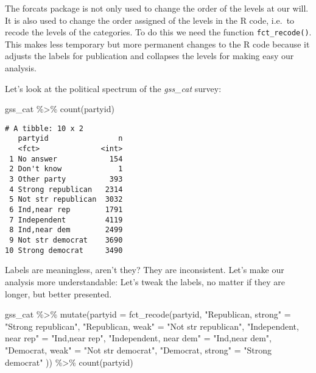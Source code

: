 \documentclass[
]{article}
\newenvironment{Shaded}{\begin{snugshade}}{\end{snugshade}}
\newcommand{\AttributeTok}[1]{\textcolor[rgb]{0.77,0.63,0.00}{#1}}
\newcommand{\FunctionTok}[1]{\textcolor[rgb]{0.00,0.00,0.00}{#1}}
\newcommand{\NormalTok}[1]{#1}
\newcommand{\OtherTok}[1]{\textcolor[rgb]{0.56,0.35,0.01}{#1}}
\newcommand{\SpecialCharTok}[1]{\textcolor[rgb]{0.00,0.00,0.00}{#1}}
\newcommand{\StringTok}[1]{\textcolor[rgb]{0.31,0.60,0.02}{#1}}
\begin{document}
The forcats package is not only used to change the order of the levels
at our will. It is also used to change the order assigned of the levels
in the R code, i.e.~to recode the levels of the categories. To do this
we need the function \texttt{fct\_recode()}. This makes less temporary
but more permanent changes to the R code because it adjusts the labels
for publication and collapses the levels for making easy our analysis.

Let's look at the political spectrum of the \emph{gss\_cat} survey:

\begin{Shaded}
\begin{Highlighting}[]
\NormalTok{gss\_cat }\SpecialCharTok{\%\textgreater{}\%} \FunctionTok{count}\NormalTok{(partyid)}
\end{Highlighting}
\end{Shaded}

\begin{verbatim}
# A tibble: 10 x 2
   partyid                n
   <fct>              <int>
 1 No answer            154
 2 Don't know             1
 3 Other party          393
 4 Strong republican   2314
 5 Not str republican  3032
 6 Ind,near rep        1791
 7 Independent         4119
 8 Ind,near dem        2499
 9 Not str democrat    3690
10 Strong democrat     3490
\end{verbatim}

Labels are meaningless, aren't they? They are inconsistent. Let's make
our analysis more understandable: Let's tweak the labels, no matter if
they are longer, but better presented.

\begin{Shaded}
\begin{Highlighting}[]
\NormalTok{gss\_cat }\SpecialCharTok{\%\textgreater{}\%}
  \FunctionTok{mutate}\NormalTok{(}\AttributeTok{partyid =} \FunctionTok{fct\_recode}\NormalTok{(partyid,}
    \StringTok{"Republican, strong"}    \OtherTok{=} \StringTok{"Strong republican"}\NormalTok{,}
    \StringTok{"Republican, weak"}      \OtherTok{=} \StringTok{"Not str republican"}\NormalTok{,}
    \StringTok{"Independent, near rep"} \OtherTok{=} \StringTok{"Ind,near rep"}\NormalTok{,}
    \StringTok{"Independent, near dem"} \OtherTok{=} \StringTok{"Ind,near dem"}\NormalTok{,}
    \StringTok{"Democrat, weak"}        \OtherTok{=} \StringTok{"Not str democrat"}\NormalTok{,}
    \StringTok{"Democrat, strong"}      \OtherTok{=} \StringTok{"Strong democrat"}
\NormalTok{  )) }\SpecialCharTok{\%\textgreater{}\%}
  \FunctionTok{count}\NormalTok{(partyid)}
\end{Highlighting}
\end{Shaded}
\end{document}
